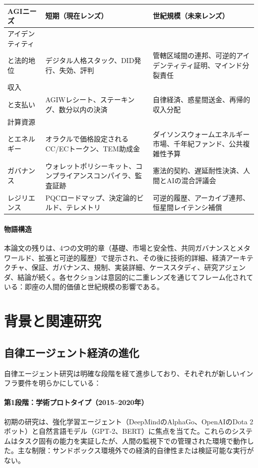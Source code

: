 \documentclass[11pt]{article}
\begin{document}
\begin{longtable}{@{}p{}p{}p{}@{}}
\toprule
\textbf{AGIニーズ} & \textbf{短期（現在レンズ）} & \textbf{世紀規模（未来レンズ）} \\\midrule
アイデンティティ \\ と法的地位 & デジタル人格スタック、DID発行、失効、評判 & 管轄区域間の連邦、可逆的アイデンティティ証明、マインド分裂責任 \\
収入 \\ と支払い & AGIWレシート、ステーキング、数分以内の決済 & 自律経済、惑星間送金、再帰的収入分配 \\
計算資源 \\ とエネルギー & オラクルで価格設定されるCC/ECトークン、TEM助成金 & ダイソンスウォームエネルギー市場、千年紀ファンド、公共複雑性予算 \\
ガバナンス & ウォレットポリシーキット、コンプライアンスコンパイラ、監査証跡 & 憲法的契約、遅延耐性決済、人間とAIの混合評議会 \\
レジリエンス & PQCロードマップ、決定論的ビルド、テレメトリ & 可逆的履歴、アーカイブ連邦、恒星間レイテンシ補償 \\\bottomrule
\end{longtable}

\paragraph{物語構造} 本論文の残りは、4つの文明的章（基礎、市場と安全性、共同ガバナンスとメタワールド、拡張と可逆的履歴）で提示され、その後に技術的詳細、経済アーキテクチャ、保証、ガバナンス、規制、実装詳細、ケーススタディ、研究アジェンダ、結論が続く。各セクションは意図的に二重レンズを通じてフレーム化されている：即座の人間的価値と世紀規模の影響である。

\section{背景と関連研究}
\subsection{自律エージェント経済の進化}
自律エージェント研究は明確な段階を経て進歩しており、それぞれが新しいインフラ要件を明らかにしている：

\paragraph{第1段階：学術プロトタイプ（2015--2020年）} 初期の研究は、強化学習エージェント（DeepMindのAlphaGo、OpenAIのDota 2ボット）と自然言語モデル（GPT-2、BERT）に焦点を当てた。これらのシステムはタスク固有の能力を実証したが、人間の監視下での管理された環境で動作した。主な制限：サンドボックス環境外での経済的自律性または検証可能な実行がない。
\end{document}
